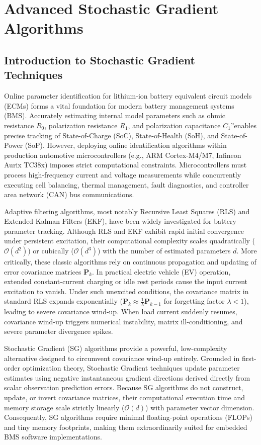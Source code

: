 ﻿%

\chapter{Advanced Stochastic Gradient Algorithms}
\label{ch:advanced_stochastic_gradient}

\section{Introduction to Stochastic Gradient Techniques}
\label{sec:sg_intro}

Online parameter identification for lithium-ion battery equivalent circuit models (ECMs) forms a vital foundation for modern battery management systems (BMS). Accurately estimating internal model parameters such as ohmic resistance $R_0$, polarization resistance $R_1$, and polarization capacitance $C_1$”enables precise tracking of State-of-Charge (SoC), State-of-Health (SoH), and State-of-Power (SoP). However, deploying online identification algorithms within production automotive microcontrollers (e.g., ARM Cortex-M4/M7, Infineon Aurix TC38x) imposes strict computational constraints. Microcontrollers must process high-frequency current and voltage measurements while concurrently executing cell balancing, thermal management, fault diagnostics, and controller area network (CAN) bus communications.

Adaptive filtering algorithms, most notably Recursive Least Squares (RLS) and Extended Kalman Filters (EKF), have been widely investigated for battery parameter tracking. Although RLS and EKF exhibit rapid initial convergence under persistent excitation, their computational complexity scales quadratically ($\mathcal{O}(d^2)$) or cubically ($\mathcal{O}(d^3)$) with the number of estimated parameters $d$. More critically, these classic algorithms rely on continuous propagation and updating of error covariance matrices $\mathbf{P}_k$. In practical electric vehicle (EV) operation, extended constant-current charging or idle rest periods cause the input current excitation to vanish. Under such unexcited conditions, the covariance matrix in standard RLS expands exponentially ($\mathbf{P}_k \approx \frac{1}{\lambda} \mathbf{P}_{k-1}$ for forgetting factor $\lambda < 1$), leading to severe covariance wind-up. When load current suddenly resumes, covariance wind-up triggers numerical instability, matrix ill-conditioning, and severe parameter divergence spikes.

Stochastic Gradient (SG) algorithms provide a powerful, low-complexity alternative designed to circumvent covariance wind-up entirely. Grounded in first-order optimization theory, Stochastic Gradient techniques update parameter estimates using negative instantaneous gradient directions derived directly from scalar observation prediction errors. Because SG algorithms do not construct, update, or invert covariance matrices, their computational execution time and memory storage scale strictly linearly ($\mathcal{O}(d)$) with parameter vector dimension. Consequently, SG algorithms require minimal floating-point operations (FLOPs) and tiny memory footprints, making them extraordinarily suited for embedded BMS software implementations.

